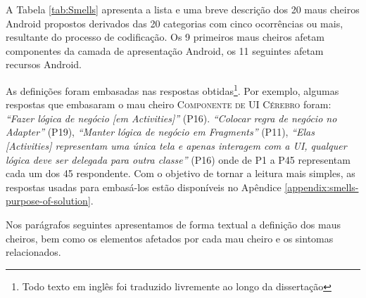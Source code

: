 A Tabela \ref{tab:Smells} apresenta a lista e uma breve descrição dos 20 maus cheiros Android propostos derivados das 20 categorias com cinco ocorrências ou mais, resultante do processo de codificação. Os 9 primeiros maus cheiros afetam componentes da camada de apresentação Android, os 11 seguintes afetam recursos Android.

As definições foram embasadas nas respostas obtidas\footnote{Todo texto em inglês foi traduzido livremente ao longo da dissertação}. Por exemplo, algumas respostas que embasaram o mau cheiro \textsc{\small Componente de UI Cérebro} foram: \textit{``Fazer lógica de negócio [em Activities]''} (P16). \textit{``Colocar regra de negócio no Adapter''} (P19), \textit{``Manter lógica de negócio em Fragments''} (P11), \textit{``Elas [Activities] representam uma única tela e apenas interagem com a UI, qualquer lógica deve ser delegada para outra classe''} (P16) onde de P1 a P45 representam cada um dos 45 respondente. Com o objetivo de tornar a leitura mais simples, as respostas usadas para embasá-los estão disponíveis no Apêndice \ref{appendix:smells-purpose-of-solution}.


Nos parágrafos seguintes apresentamos de forma textual a definição dos maus cheiros, bem como os elementos afetados por cada mau cheiro e os sintomas relacionados.

